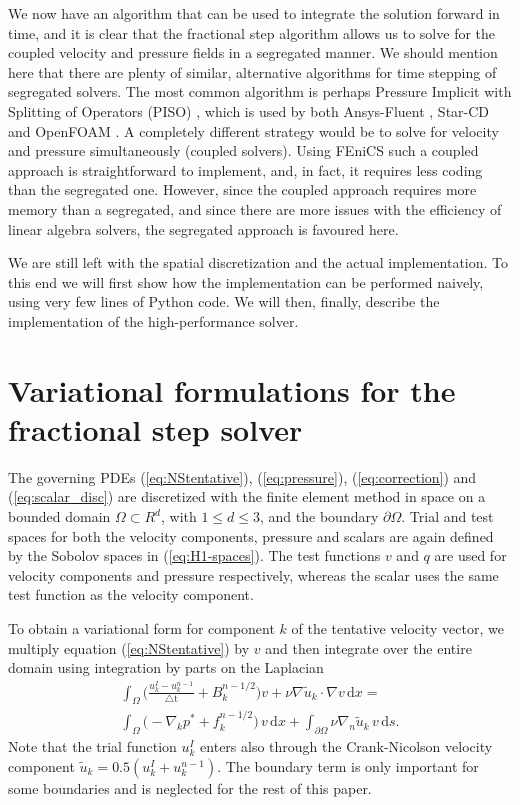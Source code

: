 \documentclass[final,3p,times,twocolumn]{elsarticle}
\newcounter{bla}
\begin{document}
We now have an algorithm that can be used to integrate the solution forward in time, and it is clear that the fractional step algorithm allows us to solve for the coupled velocity and pressure fields in a segregated manner. We should mention here that there are plenty of similar, alternative algorithms for time stepping of segregated solvers. The most common algorithm is perhaps Pressure Implicit with Splitting of Operators (PISO) \cite{piso}, which is used by both Ansys-Fluent \cite{fluent}, Star-CD \cite{starcd} and OpenFOAM \cite{openfoam}. A completely different strategy would be to solve for velocity and pressure simultaneously (coupled solvers). Using FEniCS such a coupled approach is straightforward to implement, and, in fact, it requires less coding than the segregated one. However, since the coupled approach requires more memory than a segregated, and since there are more issues with the efficiency of linear algebra solvers, the segregated approach is favoured here.

We are still left with the spatial discretization and the actual implementation. To this end we will first show how the implementation can be performed naively, using very few lines of Python code. We will then, finally, describe the implementation of the high-performance solver.

\section{Variational formulations for the fractional step solver}
\label{sec:variational}


The governing PDEs (\ref{eq:NStentative}), (\ref{eq:pressure}), (\ref{eq:correction}) and (\ref{eq:scalar_disc}) are discretized with the finite element method in space on a bounded domain $\Omega \subset R^d$, with $1 \leq d \leq 3$, and the boundary $\partial \Omega$. Trial and test spaces for both the velocity components, pressure and scalars are again defined by the Sobolov spaces in (\ref{eq:H1-spaces}). The test functions $v$ and $q$ are used for velocity components and pressure respectively, whereas the scalar uses the same test function as the velocity component.

To obtain a variational form for component $k$ of the tentative velocity vector, we multiply equation (\ref{eq:NStentative}) by $v$ and then integrate over the entire domain using integration by parts on the Laplacian
\begin{multline}
\int_{\Omega} \Big ( \frac{u_k^{I} - u_k^{n-1}}{\triangle \text{t}} + B_k^{n-1/2} \Big) v + \nu \nabla \tilde{u}_k \cdot \nabla v \, \mathrm{d}x = \\
\int_{\Omega} \Big (- \nabla_k p^{*} + f_k^{n-1/2} \Big) \, v \, \mathrm{d}x + \int_{\partial \Omega} \nu \nabla_n \tilde{u}_k \, v\, \mathrm{d}s .  \label{eq:NStentativeFEM}
\end{multline}
Note that the trial function $u_k^{I}$ enters also through the Crank-Nicolson velocity component $\tilde{u}_k = 0.5(u_k^{I}+u_k^{n-1})$. The boundary term is only important for some boundaries and is neglected for the rest of this paper.
\end{document}
